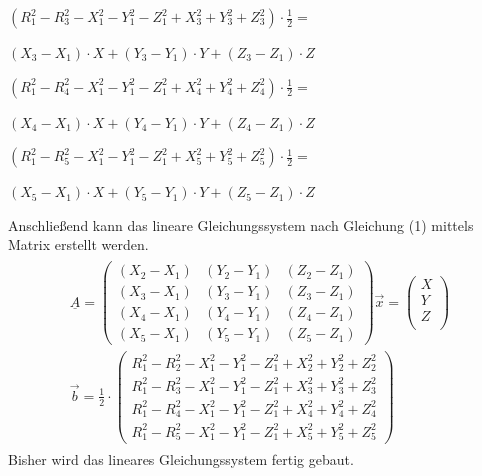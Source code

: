 \begin{flushleft}
	$(R^{2}_{1} - R^{2}_{3} - X^{2}_{1} - Y^{2}_{1} - Z^{2}_{1} + 	X^{2}_{3} + Y^{2}_{3} + Z^{2}_{3}) \cdot \frac{1}{2} =$		
\end{flushleft}
\begin{flushright}
	$(X_{3}-X_{1}) \cdot X + (Y_{3}-Y_{1}) \cdot Y +(Z_{3}-Z_{1})\cdot Z$
\end{flushright}

\begin{flushleft}
$(R^{2}_{1} - R^{2}_{4} - X^{2}_{1} - Y^{2}_{1} - Z^{2}_{1} + 	X^{2}_{4} + Y^{2}_{4} + Z^{2}_{4}) \cdot \frac{1}{2} =$	
\end{flushleft}
\begin{flushright}
	$(X_{4}-X_{1}) \cdot X + (Y_{4}-Y_{1}) \cdot Y +(Z_{4}-Z_{1}) 	\cdot Z	$	
\end{flushright}

\begin{flushleft}
	$(R^{2}_{1} - R^{2}_{5} - X^{2}_{1} - Y^{2}_{1} - Z^{2}_{1} + 	X^{2}_{5} + Y^{2}_{5} + Z^{2}_{5}) \cdot \frac{1}{2} =$
\end{flushleft}
\begin{flushright}
	$(X_{5}-X_{1}) \cdot X + (Y_{5}-Y_{1}) \cdot Y +(Z_{5}-Z_{1}) 	\cdot Z	$	
\end{flushright}	
Anschließend kann das lineare Gleichungssystem nach Gleichung (1) mittels Matrix erstellt werden.
\begin{align}
\begin{split}
\underline{A} = 
\begin{pmatrix}
(X_{2}-X_{1}) & (Y_{2}-Y_{1}) & (Z_{2}-Z_{1})\\
(X_{3}-X_{1}) & (Y_{3}-Y_{1}) & (Z_{3}-Z_{1})\\
(X_{4}-X_{1}) & (Y_{4}-Y_{1}) & (Z_{4}-Z_{1})\\
(X_{5}-X_{1}) & (Y_{5}-Y_{1}) & (Z_{5}-Z_{1})
\end{pmatrix}
\vec{x} = 
\begin{pmatrix}
X\\
Y\\
Z\\
\end{pmatrix}\\
\vec{b} = \frac{1}{2} \cdot
\begin{pmatrix}
R^{2}_{1} - R^{2}_{2} - X^{2}_{1} - Y^{2}_{1} - Z^{2}_{1} + 	X^{2}_{2} + Y^{2}_{2} + Z^{2}_{2}\\
R^{2}_{1} - R^{2}_{3} - X^{2}_{1} - Y^{2}_{1} - Z^{2}_{1} + 	X^{2}_{3} + Y^{2}_{3} + Z^{2}_{3}\\
R^{2}_{1} - R^{2}_{4} - X^{2}_{1} - Y^{2}_{1} - Z^{2}_{1} + 	X^{2}_{4} + Y^{2}_{4} + Z^{2}_{4}\\
R^{2}_{1} - R^{2}_{5} - X^{2}_{1} - Y^{2}_{1} - Z^{2}_{1} + 	X^{2}_{5} + Y^{2}_{5} + Z^{2}_{5}
\end{pmatrix}
\end{split}
\end{align}
Bisher wird das lineares Gleichungssystem fertig gebaut.


